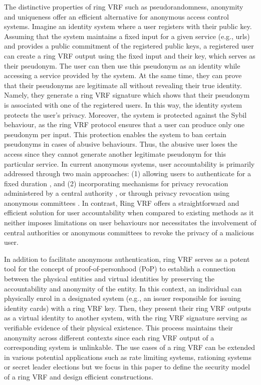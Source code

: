 The distinctive properties of ring VRF such as pseudorandomness, anonymity and uniqueness offer  an efficient alternative for anonymous access control systems. Imagine an identity system where a user registers with their public key. Assuming that the system maintains a fixed input for a given service (e.g., urls) and provides a public commitment of the registered public keys, a registered user  can create a ring VRF output using the fixed input and their key, which serves as their pseudonym.  The user can then use this pseudonym as an identity while accessing a service provided by the system. At the same time, they can prove that their pseudonyms  are  legitimate  all without revealing their true identity. Namely, they generate a ring VRF signature which shows that their pseudonym is associated with one of the registered users. In this way, the identity system protects the user's  privacy. Moreover, the  system is protected against the Sybil behaviour, as the ring VRF protocol ensures that a user can produce only one pseudonym per input. This protection enables the system to ban certain pseudonyms in cases of abusive behaviours. Thus, the abusive user loses the access since they cannot generate  another legitimate pseudonym for this particular service.
In current anonymous systems, user accountability is primarily addressed through two main approaches: (1) allowing users to authenticate for a fixed duration \cite{limited_authentication1,limited_authentication2,limited_authentication3}, and (2) incorporating mechanisms for privacy revocation administered by a central authority \cite{revocation1,revocation2,revocation3,revocation4}, or through privacy revocation using anonymous committees \cite{anonymous-committee1,anonymous-committee2}.
In contrast, Ring VRF offers a straightforward and efficient solution for user accountability when compared to existing methods as it neither imposes limitations on user behaviours nor necessitates the involvement of central authorities or anonymous committees to revoke the privacy of a malicious user.

In addition to facilitate anonymous authentication, ring VRF  serves as a potent tool for the concept of proof-of-personhood (PoP) \cite{pop2008,pop2017,pop2020} to establish a connection between the physical entities and virtual identities by preserving the accountability and anonymity of the entity. 
In this context, an individual can physically enrol in a designated system (e.g., an issuer responsible for issuing identity cards) with a ring VRF key. Then, they present their ring VRF outputs as a virtual identity to another system, with the ring VRF signature serving as verifiable evidence of their physical existence. This process maintains their anonymity across different contexts since each ring VRF output of a corresponding system is unlinkable. 
The use cases of a ring VRF  can be extended in various potential  applications such as rate limiting systems, rationing systems or secret leader elections but we focus in this paper to define the security model of a ring VRF  and design efficient constructions. 


